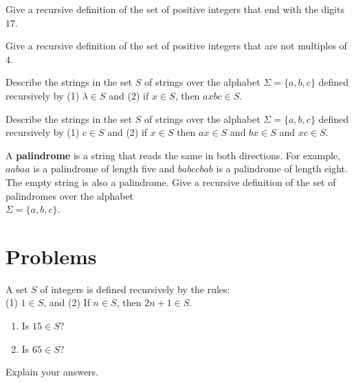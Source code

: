 \begin{exer}
 Give a recursive definition of the set of positive integers
that end with the digits $17$.
\end{exer}

\begin{exer} 
Give a recursive definition of the set of positive integers
that are not multiples of $4$.
\end{exer}

\begin{exer} 
 Describe the strings in the  set $S$ of strings over the alphabet 
$\Sigma = \{a,b,c\}$
defined recursively by (1) $\lambda \in S$ and (2) if $x\in S$, then 
$axbc\in S$. 
\end{exer}


\begin{exer} 
  Describe the strings in the set $S$ of strings over the alphabet 
$\Sigma = \{a,b,c\}$ defined recursively by (1) $c \in S$
and (2) if $x\in S$ then $ax\in S$ and $bx\in S$ and $xc\in S$.
\end{exer}


\begin{exer} 
 A {\bf palindrome} is a string that reads the same in both
directions.%
For example, $aabaa$ is a palindrome of length five and
$babccbab$ is a palindrome of length eight.  The empty string
is also a palindrome. Give a recursive
definition of the set of palindromes over the alphabet\\
$\Sigma =\{a,b,c\}$.   
\end{exer}

\clearpage
\section{Problems}

\begin{prob}
 A set $S$ of integers is defined recursively by the rules: \\[2pt]
 (1) $1\in S$, and (2) If $n\in S$, then $2n+1 \in S$. \\[2pt]
 
 \begin{enumerate} 
 \item Is $15\in S$?\\[2pt]
 \item Is $65\in S$?\\[2pt]
 \end{enumerate}
 Explain your answers.
 \end{prob}
 

